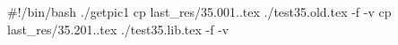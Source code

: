 #!/bin/bash
./getpic1
cp last_res/35.001..tex ./test35.old.tex -f -v
cp last_res/35.201..tex ./test35.lib.tex -f -v
